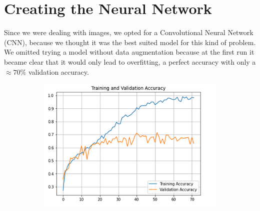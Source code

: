 \documentclass[a4paper,12pt]{article}
\numberwithin{equation}{section}
\begin{document}
\section*{Creating the Neural Network}
Since we were dealing with images, we opted for a Convolutional Neural Network (CNN), because we thought it was the best suited model for this kind of problem. We omitted trying a model without data augmentation because at the first run it became clear that it would only lead to overfitting, a perfect accuracy with only a \(\approx 70\%\) validation accuracy. 
\begin{figure}
      \begin{subfigure}{0.5\textwidth}

      \includegraphics[scale=0.5]{model_noaug_acc.png}  
      \end{subfigure}
      \begin{subfigure}{0.4\textwidth}

\end{subfigure}
\end{figure}
\end{document}
